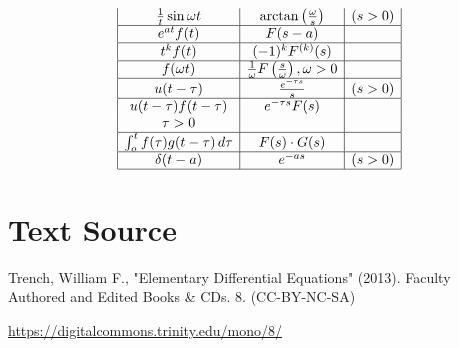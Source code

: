 \documentclass{ximera}
\begin{document}
$$\begin{array}{|c|c|c|}
  \frac{1}{t} \sin  \omega t
& \arctan \left(\frac{\omega}{s}\right) & (s>0) \\
\hline
  e^{at}f(t)  &  F(s-a)  & \\
  \hline
  t^kf(t)  & (-1)^kF^{(k)}(s)  &  \\
\hline
  f(\omega t)  &  \frac{1}{\omega} F\left(\frac{s}{\omega}\right),  \omega > 0 &  \\
  \hline
  u(t-\tau)  &
\frac{e^{-\tau s}}{s} & (s>0)  \\
\hline
  u(t-\tau)f(t-\tau)   &
e^{-\tau s}F(s)  &  \\
\tau > 0 & & \\
\hline
  \int^t_o f(\tau)g(t-\tau)\, d\tau
 &  F(s) \cdot G(s) &  \\
 \hline
  \delta(t-a)  &  e^{-as} & (s>0)\\
  \hline
\end{array}
$$
 
 
\section*{Text Source}
Trench, William F., "Elementary Differential Equations" (2013). Faculty Authored and Edited Books \& CDs. 8. (CC-BY-NC-SA)
 
\href{https://digitalcommons.trinity.edu/mono/8/}{https://digitalcommons.trinity.edu/mono/8/}
 
 
\end{document}
